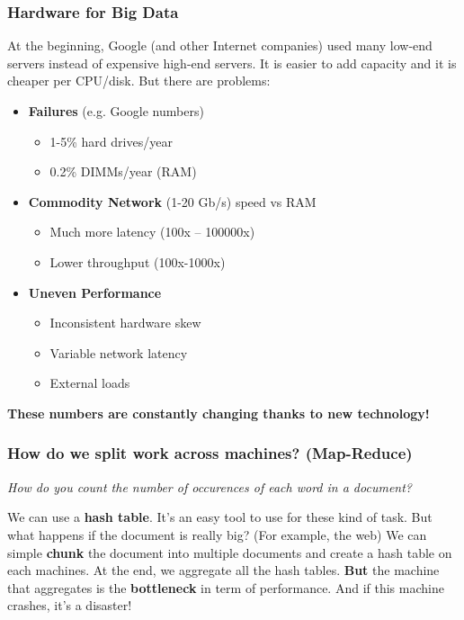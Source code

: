 \subsubsection{Hardware for Big Data}
At the beginning, Google (and other Internet companies) used many low-end servers instead of expensive high-end servers. It is easier to add capacity and it is cheaper per CPU/disk. But there are problems:
\begin{itemize}
 \item {\bf Failures} (e.g. Google numbers)
 \begin{itemize}
  \item 1-5\% hard drives/year
  \item 0.2\% DIMMs/year (RAM)
 \end{itemize}
 \item {\bf Commodity Network} (1-20 Gb/s) speed vs RAM
 \begin{itemize}
  \item Much more latency (100x -- 100000x)
  \item Lower throughput (100x-1000x)
 \end{itemize}
 \item {\bf Uneven Performance}
 \begin{itemize}
  \item Inconsistent hardware skew
  \item Variable network latency
  \item External loads
 \end{itemize}
\end{itemize}

\begin{center}
{\bf These numbers are constantly changing thanks to new technology!}
\end{center}

\subsubsection{How do we split work across machines? (Map-Reduce)}

\begin{center}
\emph{How do you count the number of occurences of each word in a document?}
\end{center}

We can use a {\bf hash table}. It's an easy tool to use for these kind of task. But what happens if the document is really big? (For example, the web) We can simple {\bf chunk} the document into multiple documents and create a hash table on each machines. At the end, we aggregate all the hash tables. {\bf But} the machine that aggregates is the {\bf bottleneck} in term of performance. And if this machine crashes, it's a disaster!

